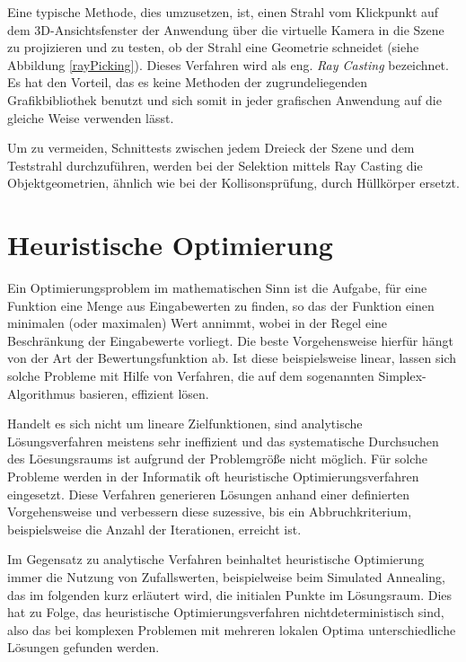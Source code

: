 Eine typische Methode, dies umzusetzen, ist, einen Strahl vom Klickpunkt auf dem 3D-Ansichtsfenster der Anwendung \"uber die virtuelle Kamera in die Szene zu projizieren und zu testen,  ob der Strahl eine Geometrie schneidet (siehe Abbildung \ref{rayPicking}).
Dieses Verfahren wird als eng. \textit{Ray Casting} bezeichnet. Es hat den Vorteil, das es keine Methoden der zugrundeliegenden Grafikbibliothek benutzt und sich somit in jeder grafischen Anwendung auf die gleiche Weise verwenden l\"asst.

Um zu vermeiden, Schnittests zwischen jedem Dreieck der Szene
und dem Teststrahl durchzuführen, werden bei der Selektion mittels Ray Casting die Objektgeometrien, \"ahnlich wie bei der Kollisonspr\"ufung, durch H\"ullk\"orper ersetzt.


\section{Heuristische Optimierung}
\label{opti}

Ein Optimierungsproblem im mathematischen Sinn ist die Aufgabe, für eine Funktion eine Menge aus Eingabewerten zu finden, so das der Funktion einen minimalen (oder maximalen) Wert annimmt, wobei in der Regel eine Beschr\"ankung der Eingabewerte vorliegt. Die beste Vorgehensweise hierf\"ur h\"angt von der Art der Bewertungsfunktion ab. Ist diese beispielsweise linear, lassen sich solche Probleme mit Hilfe von Verfahren, die auf dem  sogenannten Simplex-Algorithmus basieren, effizient l\"osen.

Handelt es sich nicht um lineare Zielfunktionen, sind analytische L\"osungsverfahren meistens sehr ineffizient und das systematische Durchsuchen des L\"oesungsraums ist aufgrund der Problemgr\"o{\ss}e nicht m\"oglich. F\"ur solche Probleme werden in der Informatik oft heuristische Optimierungsverfahren eingesetzt. Diese Verfahren generieren L\"osungen anhand einer definierten Vorgehensweise und verbessern diese suzessive, bis ein Abbruchkriterium, beispielsweise die Anzahl der Iterationen, erreicht ist. 

Im Gegensatz zu analytische Verfahren beinhaltet heuristische Optimierung immer die Nutzung von Zufallswerten, beispielweise beim Simulated Annealing, das im folgenden kurz erl\"autert wird, die initialen Punkte im L\"osungsraum. Dies hat zu Folge, das heuristische Optimierungsverfahren nichtdeterministisch sind, also das bei komplexen Problemen mit mehreren lokalen Optima unterschiedliche L\"osungen gefunden werden. 

